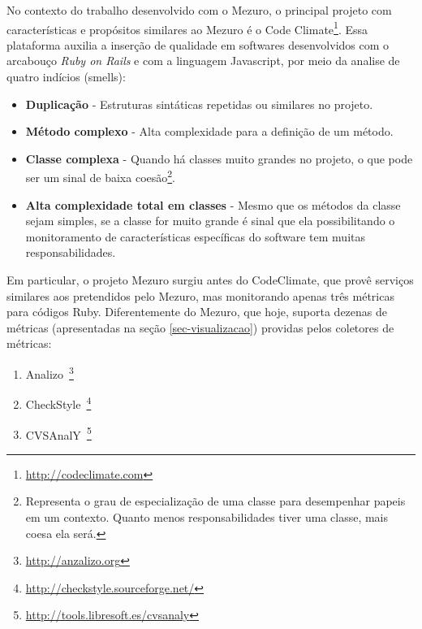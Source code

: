 

No contexto do trabalho desenvolvido com o Mezuro, o principal projeto com características e propósitos similares ao Mezuro é o Code Climate\footnote{\url{http://codeclimate.com}}. Essa plataforma auxilia a inserção de qualidade em softwares desenvolvidos com o arcabouço \textit{Ruby on Rails} e com a linguagem Javascript, por meio da analise de quatro indícios (smells): 

	\begin{itemize}
	\item \textbf{Duplicação} - Estruturas sintáticas repetidas ou similares no projeto.
	\item \textbf{Método complexo} - Alta complexidade para a definição de um método.
	\item \textbf{Classe complexa} - Quando há classes muito grandes no projeto, o que pode ser um sinal de baixa coesão\footnote{Representa o grau de especialização de uma classe para desempenhar papeis em um contexto. Quanto menos responsabilidades tiver uma classe, mais coesa ela será.}.
	\item \textbf{Alta complexidade total em classes} - Mesmo que os métodos da classe sejam simples, se a classe for muito grande é sinal que ela possibilitando o monitoramento de características específicas do software tem muitas responsabilidades.
	\end{itemize}
    
Em particular, o projeto Mezuro surgiu antes do CodeClimate, que provê serviços similares aos pretendidos pelo Mezuro, mas monitorando apenas três métricas para códigos Ruby. Diferentemente do Mezuro, que hoje, suporta dezenas de métricas (apresentadas na seção \ref{sec-visualizacao}) providas pelos coletores de métricas:
%
\begin{enumerate}
\item Analizo~\footnote{\url{http://anzalizo.org}}
\item CheckStyle~\footnote{\url{http://checkstyle.sourceforge.net/}} 
\item CVSAnalY~\footnote{\url{http://tools.libresoft.es/cvsanaly}}
\end{enumerate}

